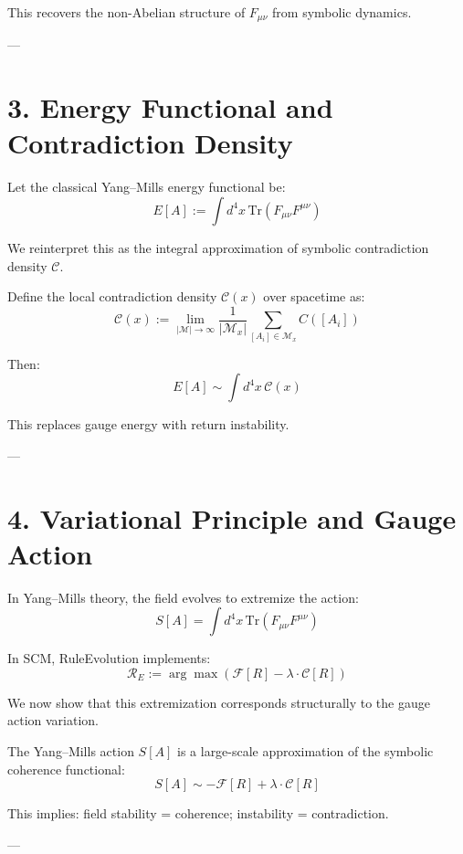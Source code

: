 This recovers the non-Abelian structure of $F_{\mu\nu}$ from symbolic dynamics.

---

\section{3. Energy Functional and Contradiction Density} \label{sec:energy-c-density}

Let the classical Yang–Mills energy functional be:
\[
E[A] := \int d^4x \, \text{Tr}(F_{\mu\nu} F^{\mu\nu})
\]

We reinterpret this as the integral approximation of symbolic contradiction density $\mathcal{C}$.

\begin{definition}
Define the local contradiction density $\mathcal{C}(x)$ over spacetime as:
\[
\mathcal{C}(x) := \lim_{|\mathcal{M}| \to \infty} \frac{1}{|\mathcal{M}_x|} \sum_{[A_i] \in \mathcal{M}_x} C([A_i])
\]

Then:
\[
E[A] \sim \int d^4x \, \mathcal{C}(x)
\]
\end{definition}

This replaces gauge energy with return instability.

---

\section{4. Variational Principle and Gauge Action} \label{sec:gauge-variation}

In Yang–Mills theory, the field evolves to extremize the action:
\[
S[A] = \int d^4x \, \text{Tr}(F_{\mu\nu} F^{\mu\nu})
\]

In SCM, RuleEvolution implements:
\[
\mathcal{R}_E := \arg \max \left( \mathcal{F}[R] - \lambda \cdot \mathcal{C}[R] \right)
\]

We now show that this extremization corresponds structurally to the gauge action variation.

\begin{theorem}
The Yang–Mills action $S[A]$ is a large-scale approximation of the symbolic coherence functional:
\[
S[A] \sim - \mathcal{F}[R] + \lambda \cdot \mathcal{C}[R]
\]
\end{theorem}

\noindent This implies: field stability = coherence; instability = contradiction.

---

